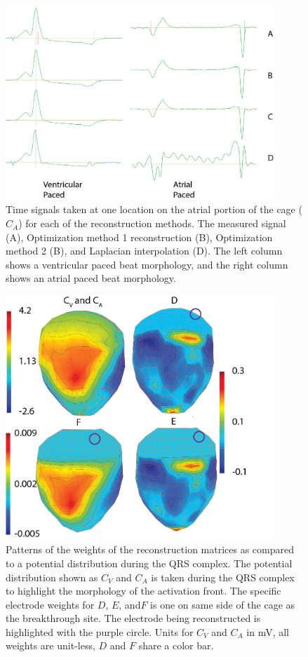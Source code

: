 \documentclass[12pt]{article}
\begin{document}
\begin{figure}[h]
	\includegraphics[width=0.9\textwidth]{Figures/cgSigs.png}
	\caption{Time signals taken at one location on the atrial portion of the cage ($C_A$) for each of the reconstruction methods. The measured signal (A), Optimization method 1 reconstruction (B), Optimization method 2 (B), and Laplacian interpolation (D). The left column shows a ventricular paced beat morphology, and the right column shows an atrial paced beat morphology.}
	\label{Fig:Sigs_cg}
\end{figure}
\begin{figure}[h]
	\centering
	\includegraphics[width=0.9\textwidth]{Figures/reco_vis.png}
	\caption{Patterns of the weights of the reconstruction matrices as compared to a potential distribution during the QRS complex. The potential distribution shown as $C_V$ and $C_A$ is taken during the QRS complex to highlight the morphology of the activation front. The specific electrode weights for $D$, $E$, and$F$ is one on same side of the cage as the breakthrough site. The electrode being reconstructed is highlighted with the purple circle. Units for $C_V$ and $C_A$ in mV, all weights are unit-less, $D$ and $F$ share a color bar.}
	\label{Fig:reco_vis}
\end{figure}
\end{document}
